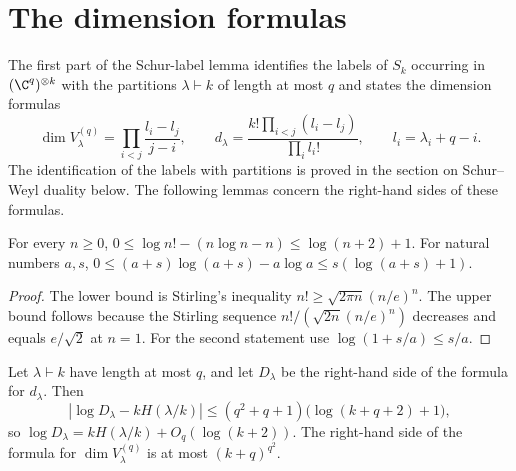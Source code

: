 




\section{The dimension formulas}

The first part of the Schur-label lemma identifies the labels of $S_k$
occurring in $(\C^q)^{\otimes k}$ with the partitions $\lambda\vdash k$ of
length at most $q$ and states the dimension formulas
\[
    \dim V^{(q)}_\lambda=\prod_{i<j}\frac{l_i-l_j}{j-i},\qquad
    d_\lambda=\frac{k!\prod_{i<j}(l_i-l_j)}{\prod_il_i!},\qquad
    l_i=\lambda_i+q-i.
\]
The identification of the labels with partitions is proved in the section on
Schur--Weyl duality below. The following lemmas concern the right-hand sides of
these formulas.

\begin{lemma}
    \label{lem:stirling_log_factorial}
    \leanok
    For every $n\ge0$,
    $0\le\log n!-(n\log n-n)\le\log(n+2)+1$. For natural numbers $a,s$,
    $0\le(a+s)\log(a+s)-a\log a\le s(\log(a+s)+1)$.
\end{lemma}

\begin{proof}\leanok
    The lower bound is Stirling's inequality
    $n!\ge\sqrt{2\pi n}(n/e)^n$. The upper bound follows because the Stirling
    sequence $n!/(\sqrt{2n}(n/e)^n)$ decreases and equals $e/\sqrt2$ at
    $n=1$. For the second statement use $\log(1+s/a)\le s/a$.
\end{proof}

\begin{lemma}
    \label{lem:hook_formula_entropy}
    \leanok
    Let $\lambda\vdash k$ have length at most $q$, and let $D_\lambda$ be the
    right-hand side of the formula for $d_\lambda$. Then
    \[
        |\log D_\lambda-kH(\lambda/k)|\le(q^2+q+1)\bigl(\log(k+q+2)+1\bigr),
    \]
    so $\log D_\lambda=kH(\lambda/k)+O_q(\log(k+2))$. The right-hand side of the
    formula for $\dim V^{(q)}_\lambda$ is at most $(k+q)^{q^2}$.
\end{lemma}

